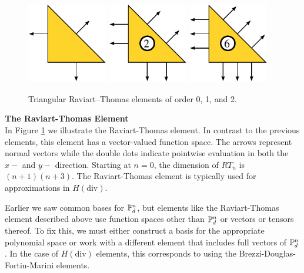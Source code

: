 \begin{figure}
  \begin{center}
    \includegraphics[height=3.5cm]{chapters/kirby-6/pdf/RT0.pdf} \hspace{0.5cm}
    \includegraphics[height=3.5cm]{chapters/kirby-6/pdf/RT1.pdf} \hspace{0.5cm}
    \includegraphics[height=3.5cm]{chapters/kirby-6/pdf/RT2.pdf}
    \caption{Triangular Raviart--Thomas elements of order 0, 1, and 2.}
    \label{Raviart-Thomas}
  \end{center}
\end{figure}

\begin{example}{\bf{The Raviart-Thomas Element}} \\

In Figure \ref{Raviart-Thomas} we illustrate the Raviart-Thomas element.
In contrast to the previous elements, this element has a vector-valued
function space.  The arrows represent normal vectors while the double
dots indicate pointwise
evaluation in both the $x-$ and $y-$ direction.  Starting at \( n = 0
\), the dimension of \( RT_n \) is \( (n+1)(n+3) \). The Raviart-Thomas
element is typically used for approximations in $H(\mathrm{div})$.
\end{example}

\begin{remark}
Earlier we saw common bases for $\P^n_d$, but
elements like the Raviart-Thomas element described above use function
spaces other than \( \P^n_d \) or vectors or tensors thereof.  To fix
this, we must either construct a basis for the appropriate polynomial
space or work with a different element that includes full vectors of
$\P^n_d$.  In the case of \( H(\mathrm{div}) \) elements, this
corresponds to using the Brezzi-Douglas-Fortin-Marini elements.
\end{remark}


